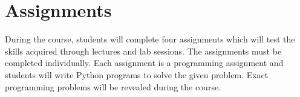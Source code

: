 \section{Assignments}
During the course, students will complete four assignments which will test the skills
acquired through lectures and lab sessions.
The assignments must be completed individually.
Each assignment is a programming assignment and students will write Python programs to solve
the given problem.
Exact programming problems will be revealed during the course.
